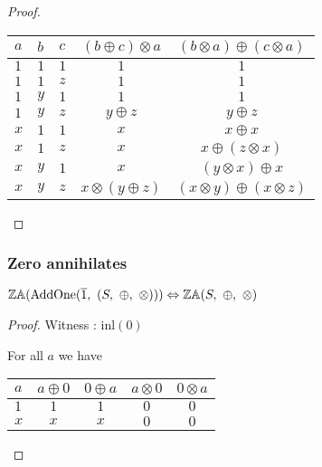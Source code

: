 \documentclass[10pt, ../Summary.tex]{subfiles}
\begin{document}
\begin{proof}
\begin{center}
\begin{tabular}{lllcc}
\toprule
$a$ & $b$ & $c$ & $(b \oplus c) \otimes a$ & $(b \otimes a) \oplus (c \otimes a)$ \\
\midrule
$1$ & $1$ & $1$ & $1$ 						& $1$ \\
$1$ & $1$ & $z$ & $1$						& $1$ \\
$1$ & $y$ & $1$ & $1$						& $1$ \\
$1$ & $y$ & $z$ & $y \oplus z$				& $y \oplus z$ \\
$x$ & $1$ & $1$ & $x$						& $x \oplus x$ \\
$x$ & $1$ & $z$ & $x$						& $x \oplus (z \otimes x)$ \\
$x$ & $y$ & $1$ & $x$						& $(y \otimes x) \oplus x$ \\
$x$ & $y$ & $z$ & $x \otimes (y \oplus z)$	& $(x \otimes y) \oplus (x \otimes z)$ \\
\bottomrule
\end{tabular}
\end{center}
\end{proof}




\subsubsection{Zero annihilates}

\begin{theorem} \label{thm:addone_zero_annihilates}
$\propname{ZA}(\mathrm{AddOne}(\overline{1},\ (S,\ \oplus,\ \otimes))) \Leftrightarrow \propname{ZA}(S,\ \oplus,\ \otimes) $
\end{theorem}

\begin{proof}

\vspace{0.5em}

Witness : $\mathrm{inl}(0)$

\vspace{0.5em}

For all $a$ we have

\begin{center}
\begin{tabular}{lcccc}
\toprule
$a$ & $a \oplus 0$ & $0 \oplus a$ & $a \otimes 0$ & $0 \otimes a$ \\
\midrule
$1$ & $1$ & $1$ & $0$ & $0$ \\
$x$ & $x$ & $x$ & $0$ & $0$	\\
\bottomrule
\end{tabular}
\end{center}

\end{proof}
\end{document}
